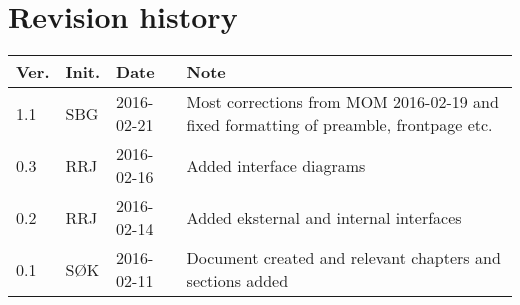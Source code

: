 \label{chp_revisionHistory}
\chapter*{Revision history}

\begin{tabular}{b{1cm} b{1cm} b{2cm} b{8cm}}
	\textbf{Ver.} & \textbf{Init.} & \textbf{Date} & \textbf{Note}\\
	\hline
    1.1 & SBG & 2016-02-21 & Most corrections from MOM 2016-02-19 and fixed formatting of preamble, frontpage etc.\\
    0.3 & RRJ & 2016-02-16 & Added interface diagrams \\
    0.2 & RRJ & 2016-02-14 & Added eksternal and internal interfaces \\
    0.1 & SØK & 2016-02-11 & Document created and relevant chapters and sections added \\
\end{tabular}

